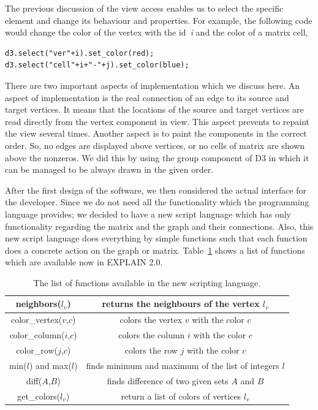 \documentclass[12pt, twoside]{book}
\begin{document}
The previous discussion of the view access enables us to select the
specific element and change its behaviour and properties. For example, the following
code would change the color of the vertex with the id~\textit{i} and the color
of a matrix cell,
\begin{lstlisting}
d3.select("ver"+i).set_color(red);
d3.select("cell"+i+"-"+j).set_color(blue);
\end{lstlisting}

There are two important aspects of implementation which we discuss here.
An aspect of implementation is the real connection of an edge to its
source and target vertices. It means that the locations of the source and target
vertices are read directly from the vertex component in view. This aspect prevents
to repaint the view several times.
Another aspect is to paint the components in the correct order. So, no edges
are displayed above vertices, or no cells of matrix are shown above the nonzeros.
We did this by using the group component of D3 in which it can be managed
to be always drawn in the given order.

After the first design of the software, we then considered the actual interface
for the developer. Since we do not need all the functionality which the
programming language provides; we decided to have a new script language which
has only functionality regarding the matrix and the graph and their
connections. Also, this new script language does everything by simple functions
such that each function does a concrete action on the graph or matrix.
Table~\ref{command-table} shows a list of functions which are available
now in EXPLAIN 2.0.
\begin{table}
\begin{tabular}{ | c | c |}
\hline
neighbors($l_v$) & returns the neighbours of the vertex $l_v$ \\ \hline
color\_vertex($v$,$c$) & colors the vertex $v$ with the color $c$ \\\hline
color\_column($i$,$c$) & colors the column $i$ with the color $c$ \\\hline
color\_row($j$,$c$) & colors the row $j$ with the color $c$ \\\hline
min($l$) and max($l$) & finds minimum and maximum of the list of integers $l$ \\\hline
diff($A$,$B$) & finds difference of two given sets $A$ and $B$ \\\hline
get\_colors($l_v$) & return a list of colors of vertices $l_v$ \\\hline
\end{tabular}
\caption{The list of functions available in the new scripting language.}
\label{command-table}
\end{table}
\end{document}
